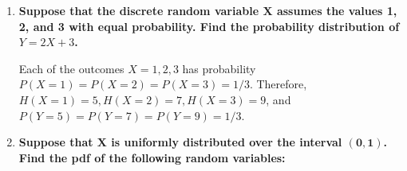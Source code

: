 \documentclass[10pt, oneside]{article}
\begin{document}
\begin{enumerate}[label=5.\arabic*]
\begin{enumerate}
	The pdf of $Y$ then follows:
	
	\[ G'(y) = g(y) = \boxed{ \frac{1}{3} y^{-2/3} e^{-y^{1/3}} } \]
	
	For $Y = X^3, x > 0$, it follows that $y > 0$. Therefore, $g(y) \geq 0$ for $y > 0$. Numerically evaluating $\frac{1}{3} \int^{+\infty}_0 y^{-2/3} e^{-y^{1/3}} dy$ gives us $\boxed{1}$.
	
	\item  \begin{tcolorbox}[
	  colback=Cerulean!5!white,
	  colframe=Cerulean!75!black]
	\textbf{$\bm{Z = 3 / (X + 1)^2}$}
	\end{tcolorbox}
	
	Here, since $Z = \frac{3}{(X + 1)^2}$ is monotonic over the interval $0 < X < +\infty$, we may apply Theorem 5.1 and find $g(z) = f(x) \big| \frac{dx}{dz} \big|$. The inverse function $X(z)$ has two branches, $X(z) = \sqrt{3/z} - 1$ and $X(z) = - \sqrt{3/z} - 1$. However, because $X$ is distributed over the positive reals, we choose the branch $X(z) = \sqrt{3/z} - 1$, defined on $0 < z < 3$. Then $\frac{dx}{dz} = \frac{1}{2} \big( \frac{3}{z} \big)^{-1/2} \big( -\frac{3}{z^2} \big)$, therefore $\big| \frac{dx}{dz} \big| = \frac{1}{2} \frac{3^{1/2}}{z^{3/2}}$. By Theorem 5.1, $g(z) = \boxed{ \frac{3^{1/2}}{2} e^{-(\sqrt{3/z} - 1)} \frac{1}{z^{3/2}} }$. For $0 < z < 3, g(z) \geq 0$. Moreover, numerical evaluation of $\int^3_0 \frac{3^{1/2}}{2} e^{-(\sqrt{3/z} - 1)} \frac{1}{z^{3/2}} dz$ gives us $\boxed{1}$.
	\end{enumerate}

\item  \begin{tcolorbox}[
  colback=Cerulean!5!white,
  colframe=Cerulean!75!black]
\textbf{Suppose that the discrete random variable $\bm{X}$ assumes the values 1, 2, and 3 with equal probability. Find the probability distribution of $Y = 2X + 3$.}
\end{tcolorbox}

Each of the outcomes $X = 1, 2, 3$ has probability $P(X = 1) = P(X = 2) = P(X = 3) = 1/3$.  Therefore, $H(X = 1) = 5, H(X = 2) = 7, H(X = 3) = 9$, and $P(Y = 5) = P(Y = 7) = P(Y = 9) = 1/3$.

\item  \begin{tcolorbox}[
  colback=Cerulean!5!white,
  colframe=Cerulean!75!black]
\textbf{Suppose that $\bm{X}$ is uniformly distributed over the interval $\bm{(0,1)}$. Find the pdf of the following random variables:}
\end{tcolorbox}


\end{enumerate}
\end{document}
